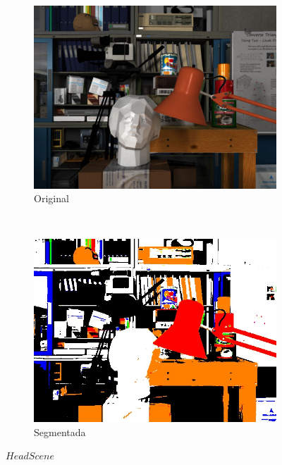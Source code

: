 \begin{figure}
        \centering
        \begin{subfigure}[b]{0.4\textwidth}
	        \includegraphics[width=\linewidth]{../Images/c2/head_scene_tsukuba_ori}
        	\caption{Original}
        	\label{fig:head_scene_tsukuba_ori}   
        \end{subfigure}%
        ~
        \begin{subfigure}[b]{0.4\textwidth}
            \includegraphics[width=\linewidth]{../Images/c2/head_scene_tsukuba_seg}
           	\caption{Segmentada}
           	\label{fig:head_scene_tsukuba_seg}
        \end{subfigure}
        \caption{$Head Scene$}
\end{figure}

